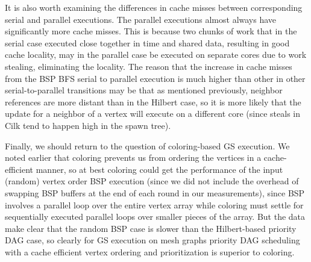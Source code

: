 \documentclass[journal]{IEEEtran}
\begin{document}
It is also worth examining the differences in cache misses between corresponding serial and parallel executions. The parallel executions almost always have significantly more cache misses. This is because two chunks of work that in the serial case executed close together in time and shared data, resulting in good cache locality, may in the parallel case be executed on separate cores due to work stealing, eliminating the locality. The reason that the increase in cache misses from the BSP BFS serial to parallel execution is much higher than other in other serial-to-parallel transitions may be that as mentioned previously, neighbor references are more distant than in the Hilbert case, so it is more likely that the update for a neighbor of a vertex will execute on a different core (since steals in Cilk tend to happen high in the spawn tree).

Finally, we should return to the question of coloring-based GS execution. We noted earlier that coloring prevents us from ordering the vertices in a cache-efficient manner, so at best coloring could get the performance of the input (random) vertex order BSP execution (since we did not include the overhead of swapping BSP buffers at the end of each round in our measurements), since BSP involves a parallel loop over the entire vertex array while coloring must settle for sequentially executed parallel loops over smaller pieces of the array. But the data make clear that the random BSP case is slower than the Hilbert-based priority DAG case, so clearly for GS execution on mesh graphs priority DAG scheduling with a cache efficient vertex ordering and prioritization is superior to coloring.
\end{document}
